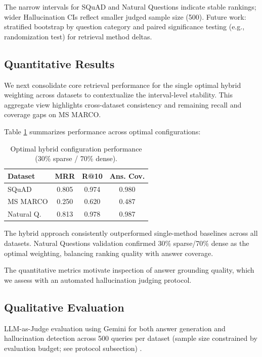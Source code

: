 \documentclass[conference]{IEEEtran}
\begin{document}
The narrow intervals for SQuAD and Natural Questions indicate stable rankings; wider Hallucination CIs reflect smaller judged sample size (500). Future work: stratified bootstrap by question category and paired significance testing (e.g., randomization test) for retrieval method deltas.

\FloatBarrier %

\subsection{Quantitative Results}
We next consolidate core retrieval performance for the single optimal hybrid weighting across datasets to contextualize the interval-level stability. This aggregate view highlights cross-dataset consistency and remaining recall and coverage gaps on MS MARCO.

Table \ref{tab:results} summarizes performance across optimal configurations:

\begin{table}[bp]
\centering
\caption{Optimal hybrid configuration performance (30\% sparse / 70\% dense).}
\label{tab:results}
\begingroup
\setlength{\tabcolsep}{4pt}
\small
\begin{tabular}{@{}l c c c@{}}
\toprule
\textbf{Dataset} & \textbf{MRR} & \textbf{R@10} & \textbf{Ans. Cov.} \\
\midrule
SQuAD & 0.805 & 0.974 & 0.980 \\
MS MARCO & 0.250 & 0.620 & 0.487 \\
Natural Q. & 0.813 & 0.978 & 0.987 \\
\bottomrule
\end{tabular}
\endgroup
\end{table}

The hybrid approach consistently outperformed single-method baselines across all datasets. Natural Questions validation confirmed 30\% sparse/70\% dense as the optimal weighting, balancing ranking quality with answer coverage.

The quantitative metrics motivate inspection of answer grounding quality, which we assess with an automated hallucination judging protocol.

\subsection{Qualitative Evaluation}

LLM-as-Judge evaluation using Gemini for both answer generation and hallucination detection across 500 queries per dataset (sample size constrained by evaluation budget; see protocol subsection) \cite{llm_judge,hallucination_survey}.
\end{document}
